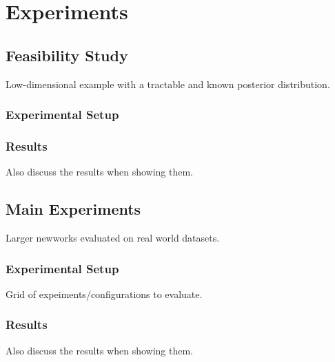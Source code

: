 \section{Experiments}\label{sec:experiments}

\subsection{Feasibility Study}
Low-dimensional example with a tractable and known posterior distribution.
\subsubsection{Experimental Setup}
\subsubsection{Results}
Also discuss the results when showing them.


\subsection{Main Experiments}
Larger newworks evaluated on real world datasets.
\subsubsection{Experimental Setup}
Grid of expeiments/configurations to evaluate.
\subsubsection{Results}
Also discuss the results when showing them.


\newpage
